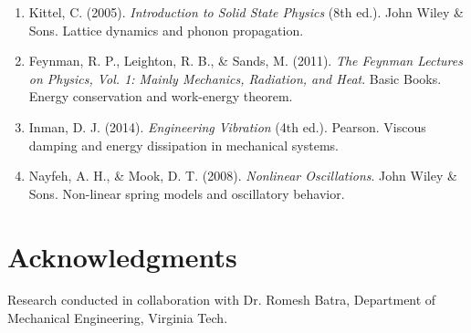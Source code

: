 \documentclass[11pt,a4paper]{article}
\begin{document}
\begin{enumerate}
    \item \label{ref:wave2} Kittel, C. (2005). \textit{Introduction to Solid State Physics} (8th ed.). John Wiley \& Sons. Lattice dynamics and phonon propagation.
    
    \item \label{ref:energy1} Feynman, R. P., Leighton, R. B., \& Sands, M. (2011). \textit{The Feynman Lectures on Physics, Vol. 1: Mainly Mechanics, Radiation, and Heat}. Basic Books. Energy conservation and work-energy theorem.
    
    \item \label{ref:damping1} Inman, D. J. (2014). \textit{Engineering Vibration} (4th ed.). Pearson. Viscous damping and energy dissipation in mechanical systems.
    
    \item \label{ref:nonlinear1} Nayfeh, A. H., \& Mook, D. T. (2008). \textit{Nonlinear Oscillations}. John Wiley \& Sons. Non-linear spring models and oscillatory behavior.
\end{enumerate}

\section{Acknowledgments}

\noindent Research conducted in collaboration with Dr. Romesh Batra, Department of Mechanical Engineering, Virginia Tech.
\end{document}
